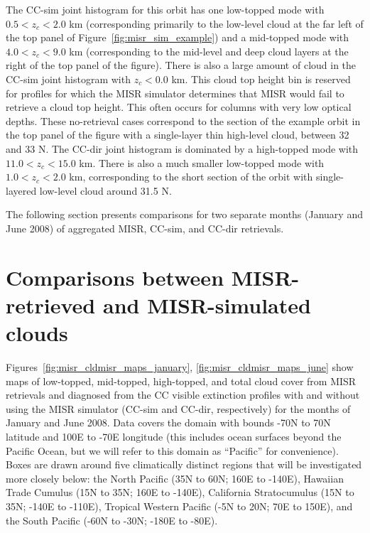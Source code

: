 The CC-sim joint histogram for this orbit has one low-topped mode with
\(0.5 < z_c < 2.0\) km (corresponding primarily to the low-level cloud
at the far left of the top panel of Figure~\ref{fig:misr_sim_example})
and a mid-topped mode with \(4.0 < z_c < 9.0\) km (corresponding to the
mid-level and deep cloud layers at the right of the top panel of the
figure). There is also a large amount of cloud in the CC-sim joint
histogram with \(z_c < 0.0\) km. This cloud top height bin is reserved
for profiles for which the MISR simulator determines that MISR would
fail to retrieve a cloud top height. This often occurs for columns with
very low optical depths. These no-retrieval cases correspond to the
section of the example orbit in the top panel of the figure with a
single-layer thin high-level cloud, between 32 and 33 N. The CC-dir
joint histogram is dominated by a high-topped mode with
\(11.0 < z_c < 15.0\) km. There is also a much smaller low-topped mode
with \(1.0 < z_c < 2.0\) km, corresponding to the short section of the
orbit with single-layered low-level cloud around 31.5 N.

The following section presents comparisons for two separate months
(January and June 2008) of aggregated MISR, CC-sim, and CC-dir
retrievals.

\section{Comparisons between MISR-retrieved and MISR-simulated
clouds}\label{sec:misrResults}

Figures~\ref{fig:misr_cldmisr_maps_january}, \ref{fig:misr_cldmisr_maps_june}
show maps of low-topped, mid-topped, high-topped, and total cloud cover
from MISR retrievals and diagnosed from the CC visible extinction
profiles with and without using the MISR simulator (CC-sim and CC-dir,
respectively) for the months of January and June 2008. Data covers the
domain with bounds -70N to 70N latitude and 100E to -70E longitude (this
includes ocean surfaces beyond the Pacific Ocean, but we will refer to
this domain as ``Pacific'' for convenience). Boxes are drawn around five
climatically distinct regions that will be investigated more closely
below: the North Pacific (35N to 60N; 160E to -140E), Hawaiian Trade
Cumulus (15N to 35N; 160E to -140E), California Stratocumulus (15N to
35N; -140E to -110E), Tropical Western Pacific (-5N to 20N; 70E to
150E), and the South Pacific (-60N to -30N; -180E to -80E).

